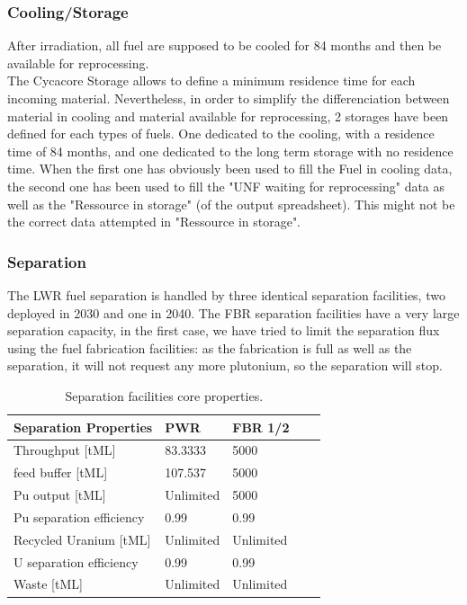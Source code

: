\documentclass[12pt]{article}
\begin{document}
\subsubsection{Cooling/Storage}
After irradiation, all fuel are supposed to be
cooled for 84 months and then be available for
reprocessing.\\
The Cycacore Storage allows to define a minimum
residence time for each incoming material.
Nevertheless, in order to simplify the
differenciation between material in cooling and
material available for reprocessing, 2 storages have
been defined for each types of fuels. One dedicated
to the cooling, with a residence time of 84 months, and one dedicated to the long term storage with
no residence time.
When the first one has obviously been used to fill
the Fuel in cooling data, the second one has been
used to fill the "UNF waiting for reprocessing"
data as well as the "Ressource in storage" (of the
output spreadsheet). This might not be the correct
 data attempted in "Ressource in storage".

\subsubsection{Separation}

The LWR fuel separation is handled by three
identical separation facilities, two deployed in
2030 and one in 2040. The FBR separation
facilities have a very large separation capacity,
in the first case, we have tried to limit the
separation flux using the fuel fabrication
facilities: as the fabrication is full as well
as the separation, it will not request any more
plutonium, so the separation will stop.

\begin{table}[h!]
\centering
\begin{tabular}{lllll}
\hline
Separation Properties	&	PWR		&	FBR 1/2	\\
\hline
Throughput [tML]		&	83.3333	&	5000		\\
feed buffer [tML]		&	107.537	&	5000		\\
Pu output  [tML]		&	Unlimited	&	5000		\\
Pu separation efficiency	&	0.99		&	0.99		\\
Recycled Uranium [tML]	&	Unlimited	&	Unlimited	\\
U separation efficiency	&	0.99		&	0.99		\\
Waste [tML]			&	Unlimited	&	Unlimited	\\
\hline
\end{tabular}
\caption{Separation facilities core properties. }
\label{tab:separation_1}
\end{table}
\end{document}
